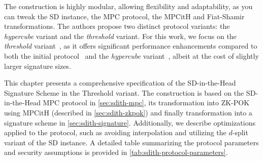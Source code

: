 \documentclass[11pt]{report}
\theoremstyle{definition}
\theoremstyle{plain}
\begin{document}
The construction is highly modular, allowing flexibility and adaptability, as you can tweak the SD instance, the MPC protocol, the MPCitH and Fiat-Shamir transformations. The authors propose two distinct protocol variants: the \textit{hypercube} variant and the \textit{threshold} variant. For this work, we focus on the \textit{threshold} variant~\cite{aguilarsyndrome11,feneuil2023threshold,feneuil2023threshold2}, as it offers significant performance enhancements compared to both the initial protocol~\cite{feneuil2022syndrome} and the \textit{hypercube} variant~\cite{aguilarsyndrome11,aguilar2023return,feneuil2023threshold2}, albeit at the cost of slightly larger signature sizes.

This chapter presents a comprehensive specification of the SD-in-the-Head Signature Scheme in the Threshold variant. The construction is based on the SD-in-the-Head MPC protocol in \autoref{sec:sdith-mpc}, its transformation into ZK-POK using MPCitH (described in \autoref{sec:sdith-zkpok}) and finally transformation into a signature scheme in \autoref{sec:sdith-signature}. Additionally, we describe optimizations applied to the protocol, such as avoiding interpolation and utilizing the $d$-split variant of the SD instance. A detailed table summarizing the protocol parameters and security assumptions is provided in \autoref{tab:sdith-protocol-parameters}.
\end{document}
